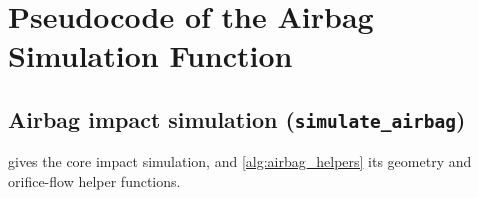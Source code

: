 \chapter{Pseudocode of the Airbag Simulation Function}
\label{appendix:pseudocode}

\section{Airbag impact simulation (\texttt{simulate\_airbag})}
\label{appendix:pseudocode-oracle}

 gives the core impact simulation, and \cref{alg:airbag_helpers} its geometry and orifice-flow helper functions.



%
%
% 


